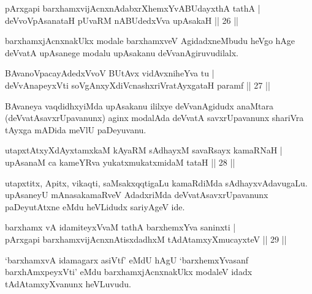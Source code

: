 
\begin{shl}
pArxgapi barxhamxvijAcnxnAdabxrXhemxYvABUdayxthA tathA |\\
deVvoVpAsanataH pUvaRM nABUdedxVva upAsakaH \hfill || 26 || 
\end{shl}

\begin{artha}
barxhamxjAcnxnakUkx modale barxhamxveV AgidadxneMbudu heVgo hAge deVvatA upAsanege modalu upAsakanu deVvanAgiruvudilalx. 
\end{artha}


\begin{shl}
BAvanoVpacayAdedxVvoV BUtAvx vidAvxniheYva tu |\\
deVvAnapeyxVti soV\s gAnxyXdiVcnashxriVratAyxgataH paramf \hfill || 27 || 
\end{shl}

\begin{artha}
BAvaneya vaqdidhxyiMda upAsakanu ililxye deVvanAgidudx anaMtara (deVvatAsavxrUpavanunx) aginx modalAda deVvatA savxrUpavanunx shariVra tAyxga mADida meVlU paDeyuvanu.
\end{artha}

\begin{shl}
utapxtAtxyXdAyxtamxkaM kAyaRM sAdhayxM savaRsayx kamaRNaH |\\
upAsanaM ca kameYRva yukatxmukatxmidaM tataH \hfill || 28 || 
\end{shl}

\begin{artha}
utapxtitx, Apitx, vikaqti, saMsakxqqtigaLu kamaRdiMda sAdhayxvAdavugaLu. upAsaneyU mAnasakamaRveV AdadxriMda deVvatAsavxrUpavanunx paDeyutAtxne eMdu heVLidudx sariyAgeV ide.
\end{artha}

\begin{shl}
barxhamx vA idamiteyxVvaM tathA barxhemxYva saninxti |\\
pArxgapi barxhamxvijAcnxnAtisxdadhxM tAdAtamxyXmucayxteV \hfill || 29 || 
\end{shl}

\begin{artha}
`barxhamxvA idamagarx asiVtf' eMdU hAgU `barxhemxYvasanf barxhAmxpeyxVti' eMdu barxhamxjAcnxnakUkx modaleV idadx tAdAtamxyXvanunx heVLuvudu.
\end{artha}

